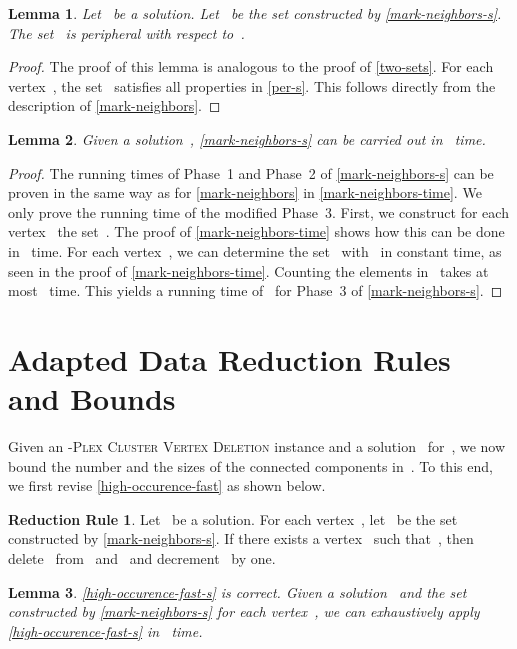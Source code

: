 \documentclass[12pt, a4paper, abstracton]{scrreprt}
\newcommand{\premv}[1]{Let~ be a solution. For each vertex~, let~ be the set constructed by \autoref{#1}.}
\newcommand{\prem}[1]{Let~ be a solution. Let~ be the set constructed by \autoref{#1}.}
\newcommand{\name}{\textsc}
\newcommand{\pvd}[1]{\name{\mbox{-Plex} Cluster Vertex Deletion}}
\newcounter{theorem}
\newtheorem{lemma}{Lemma}[chapter]
\theoremstyle{definition}
\newtheorem{rul}{Reduction Rule}[chapter]
\theoremstyle{remark}
\begin{document}
\begin{lemma}\label{s-sets}
 \prem{mark-neighbors-s} The set~ is peripheral with respect
  to~.
\end{lemma}

\begin{proof}
  The proof of this lemma is analogous to the proof of
  \autoref{two-sets}. For each vertex~, the set~ satisfies
  all properties in \autoref{per-s}. This follows directly from the
  description of \autoref{mark-neighbors}.
\end{proof}
 
\begin{lemma}\label{mark-neighbors-time-s}
  Given a solution~, \autoref{mark-neighbors-s} can be carried out in ~time.
\end{lemma}
 
\begin{proof}
  The running times of Phase~1 and Phase~2 of \autoref{mark-neighbors-s} can be proven in the same way as for \autoref{mark-neighbors} in \autoref{mark-neighbors-time}. We only prove the running time of the modified Phase~3. First, we construct for each vertex~ the set~. The proof of \autoref{mark-neighbors-time} shows how this can be done in~ time. For each vertex~, we can determine the set~ with~ in constant time, as seen in the proof of \autoref{mark-neighbors-time}. Counting the elements in~ takes at most~ time.  This yields a running time of~ for Phase~3 of \autoref{mark-neighbors-s}.
\end{proof}
 
\section{Adapted Data Reduction Rules and Bounds}\label{bounds-s}
\noindent Given an \pvd s instance  and a solution~ for~,
we now bound the number and the sizes of the connected
components in~. To this end, we first revise
\autoref{high-occurence-fast} as shown below.

\begin{rul}\label{high-occurence-fast-s}
  \premv{mark-neighbors-s} If there exists a vertex~ such that~, then delete~ from~ and~ and decrement~ by one.
\end{rul}

\begin{lemma}\label{high-occurence-time-s}
  \autoref{high-occurence-fast-s} is correct. Given a solution~ and the set~ constructed by \autoref{mark-neighbors-s} for each vertex~, we can exhaustively apply \autoref{high-occurence-fast-s} in ~time.
\end{lemma}
 
\end{document}
